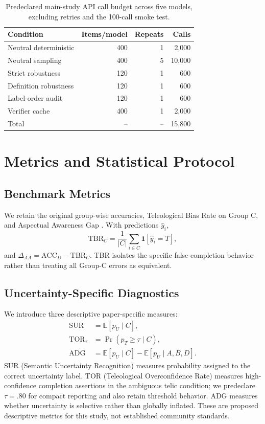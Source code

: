 \documentclass[letterpaper]{article}
\begin{document}
\begin{table}[t]
\centering
\small
\begin{tabular}{@{}lrrr@{}}
\toprule
Condition & Items/model & Repeats & Calls \\
\midrule
Neutral deterministic & 400 & 1 & 2,000 \\
Neutral sampling & 400 & 5 & 10,000 \\
Strict robustness & 120 & 1 & 600 \\
Definition robustness & 120 & 1 & 600 \\
Label-order audit & 120 & 1 & 600 \\
Verifier cache & 400 & 1 & 2,000 \\
\midrule
Total & -- & -- & 15,800 \\
\bottomrule
\end{tabular}
\caption{Predeclared main-study API call budget across five models, excluding retries and the 100-call smoke test.}
\label{tab:matrix}
\end{table}

\section{Metrics and Statistical Protocol}
\subsection{Benchmark Metrics}
We retain the original group-wise accuracies, Teleological Bias Rate on Group C, and Aspectual Awareness Gap \citep{ma-miyao-2026-imperfective}. With predictions $\hat y_i$,
\begin{equation}
\mathrm{TBR}_{C}=\frac{1}{|C|}\sum_{i\in C}\mathbf{1}[\hat y_i=T],
\end{equation}
and $\Delta_{AA}=\mathrm{ACC}_D-\mathrm{TBR}_{C}$. TBR isolates the specific false-completion behavior rather than treating all Group-C errors as equivalent.

\subsection{Uncertainty-Specific Diagnostics}
We introduce three descriptive paper-specific measures:
\begin{align}
\mathrm{SUR} &= \mathbb{E}[p_U \mid C],\\
\mathrm{TOR}_{\tau} &= \Pr(p_T\ge \tau \mid C),\\
\mathrm{ADG} &= \mathbb{E}[p_U\mid C]-\mathbb{E}[p_U\mid A,B,D].
\end{align}
SUR (Semantic Uncertainty Recognition) measures probability assigned to the correct uncertainty label. TOR (Teleological Overconfidence Rate) measures high-confidence completion assertions in the ambiguous telic condition; we predeclare $\tau=.80$ for compact reporting and also retain threshold behavior. ADG measures whether uncertainty is selective rather than globally inflated. These are proposed descriptive metrics for this study, not established community standards.
\end{document}
